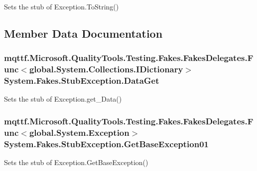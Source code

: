 Sets the stub of Exception.\-To\-String()



\subsection{Member Data Documentation}
\hypertarget{class_system_1_1_fakes_1_1_stub_exception_a76b9c43c5b5845e849532e886c21f191}{
\subsubsection[{Data\-Get}]{\setlength{\rightskip}{0pt plus 5cm}mqttf.\-Microsoft.\-Quality\-Tools.\-Testing.\-Fakes.\-Fakes\-Delegates.\-Func$<$global.\-System.\-Collections.\-I\-Dictionary$>$ System.\-Fakes.\-Stub\-Exception.\-Data\-Get}}\label{class_system_1_1_fakes_1_1_stub_exception_a76b9c43c5b5845e849532e886c21f191}


Sets the stub of Exception.\-get\-\_\-\-Data()

\hypertarget{class_system_1_1_fakes_1_1_stub_exception_a6197fe0ba1ade3c992d1e90da2024117}{
\subsubsection[{Get\-Base\-Exception01}]{\setlength{\rightskip}{0pt plus 5cm}mqttf.\-Microsoft.\-Quality\-Tools.\-Testing.\-Fakes.\-Fakes\-Delegates.\-Func$<$global.\-System.\-Exception$>$ System.\-Fakes.\-Stub\-Exception.\-Get\-Base\-Exception01}}\label{class_system_1_1_fakes_1_1_stub_exception_a6197fe0ba1ade3c992d1e90da2024117}


Sets the stub of Exception.\-Get\-Base\-Exception()

